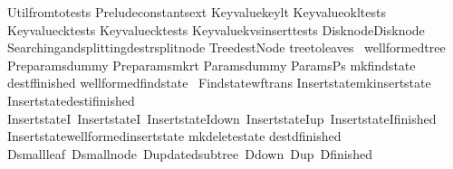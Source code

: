 \begin{isabellebody}
Util{\isachardot}from{\isacharunderscore}to{\isacharunderscore}tests\isanewline
\isanewline
Prelude{\isachardot}constants{\isacharunderscore}ext\isanewline
\isanewline
Key{\isacharunderscore}value{\isachardot}key{\isacharunderscore}lt\isanewline
\isanewline
\isanewline
Key{\isacharunderscore}value{\isachardot}okl{\isacharunderscore}tests\isanewline
Key{\isacharunderscore}value{\isachardot}ck{\isacharunderscore}tests\isanewline
Key{\isacharunderscore}value{\isachardot}ck{}{\isacharunderscore}tests\isanewline
Key{\isacharunderscore}value{\isachardot}kvs{\isacharunderscore}insert{\isacharunderscore}tests\isanewline
\isanewline
\isanewline
\isanewline
\isanewline
Disk{\isacharunderscore}node{\isachardot}Disk{\isacharunderscore}node\isanewline
\isanewline
Searching{\isacharunderscore}and{\isacharunderscore}splitting{\isachardot}dest{\isacharunderscore}rsplit{\isacharunderscore}node\isanewline
\isanewline
\isanewline
Tree{\isachardot}dest{\isacharunderscore}Node\isanewline
\isanewline
tree{\isacharunderscore}to{\isacharunderscore}leaves\ \isanewline
wellformed{\isacharunderscore}tree\isanewline
\isanewline
\isanewline
\isanewline
Pre{\isacharunderscore}params{\isachardot}dummy\isanewline
Pre{\isacharunderscore}params{\isachardot}mk{\isacharunderscore}r{}t\isanewline
\isanewline
\isanewline
Params{\isachardot}dummy\isanewline
Params{\isachardot}Ps{}\isanewline
\isanewline
\isanewline
mk{\isacharunderscore}find{\isacharunderscore}state\isanewline
dest{\isacharunderscore}f{\isacharunderscore}finished\isanewline
wellformed{\isacharunderscore}find{\isacharunderscore}state\ \isanewline
Find{\isacharunderscore}state{\isachardot}wf{\isacharunderscore}trans\isanewline
\isanewline
Insert{\isacharunderscore}state{\isachardot}mk{\isacharunderscore}insert{\isacharunderscore}state\isanewline
Insert{\isacharunderscore}state{\isachardot}dest{\isacharunderscore}i{\isacharunderscore}finished\isanewline
Insert{\isacharunderscore}state{\isachardot}I{}\ Insert{\isacharunderscore}state{\isachardot}I{}\ Insert{\isacharunderscore}state{\isachardot}I{\isacharunderscore}down\ Insert{\isacharunderscore}state{\isachardot}I{\isacharunderscore}up\ Insert{\isacharunderscore}state{\isachardot}I{\isacharunderscore}finished\isanewline
Insert{\isacharunderscore}state{\isachardot}wellformed{\isacharunderscore}insert{\isacharunderscore}state\isanewline
\isanewline
mk{\isacharunderscore}delete{\isacharunderscore}state\isanewline
dest{\isacharunderscore}d{\isacharunderscore}finished\isanewline
D{\isacharunderscore}small{\isacharunderscore}leaf\ D{\isacharunderscore}small{\isacharunderscore}node\ D{\isacharunderscore}updated{\isacharunderscore}subtree\ D{\isacharunderscore}down\ D{\isacharunderscore}up\ D{\isacharunderscore}finished\ \ \isanewline

\end{isabellebody}
